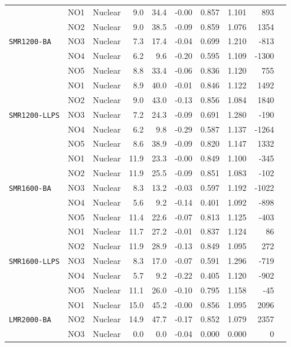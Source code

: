 \begin{table}[htbp]
\begin{tabular}{lllrrrrrrr}
\midrule
\multirow{5}{*}{\texttt{SMR1200-BA}} & NO1 & Nuclear & 9.0 & 34.4 & -0.00 & 0.857 & 1.101 & 893 \\
 & NO2 & Nuclear & 9.0 & 38.5 & -0.09 & 0.859 & 1.076 & 1354 \\
 & NO3 & Nuclear & 7.3 & 17.4 & -0.04 & 0.699 & 1.210 & -813 \\
 & NO4 & Nuclear & 6.2 & 9.6 & -0.20 & 0.595 & 1.109 & -1300 \\
 & NO5 & Nuclear & 8.8 & 33.4 & -0.06 & 0.836 & 1.120 & 755 \\
\midrule
\multirow{5}{*}{\texttt{SMR1200-LLPS}} & NO1 & Nuclear & 8.9 & 40.0 & -0.01 & 0.846 & 1.122 & 1492 \\
 & NO2 & Nuclear & 9.0 & 43.0 & -0.13 & 0.856 & 1.084 & 1840 \\
 & NO3 & Nuclear & 7.2 & 24.3 & -0.09 & 0.691 & 1.280 & -190 \\
 & NO4 & Nuclear & 6.2 & 9.8 & -0.29 & 0.587 & 1.137 & -1264 \\
 & NO5 & Nuclear & 8.6 & 38.9 & -0.09 & 0.820 & 1.147 & 1332 \\
\midrule
\multirow{5}{*}{\texttt{SMR1600-BA}} & NO1 & Nuclear & 11.9 & 23.3 & -0.00 & 0.849 & 1.100 & -345 \\
 & NO2 & Nuclear & 11.9 & 25.5 & -0.09 & 0.851 & 1.083 & -102 \\
 & NO3 & Nuclear & 8.3 & 13.2 & -0.03 & 0.597 & 1.192 & -1022 \\
 & NO4 & Nuclear & 5.6 & 9.2 & -0.14 & 0.401 & 1.092 & -898 \\
 & NO5 & Nuclear & 11.4 & 22.6 & -0.07 & 0.813 & 1.125 & -403 \\
\midrule
\multirow{5}{*}{\texttt{SMR1600-LLPS}} & NO1 & Nuclear & 11.7 & 27.2 & -0.01 & 0.837 & 1.124 & 86 \\
 & NO2 & Nuclear & 11.9 & 28.9 & -0.13 & 0.849 & 1.095 & 272 \\
 & NO3 & Nuclear & 8.3 & 17.0 & -0.07 & 0.591 & 1.296 & -719 \\
 & NO4 & Nuclear & 5.7 & 9.2 & -0.22 & 0.405 & 1.120 & -902 \\
 & NO5 & Nuclear & 11.1 & 26.0 & -0.10 & 0.795 & 1.158 & -45 \\
\midrule
\multirow{5}{*}{\texttt{LMR2000-BA}} & NO1 & Nuclear & 15.0 & 45.2 & -0.00 & 0.856 & 1.095 & 2096 \\
 & NO2 & Nuclear & 14.9 & 47.7 & -0.17 & 0.852 & 1.079 & 2357 \\
 & NO3 & Nuclear & 0.0 & 0.0 & -0.04 & 0.000 & 0.000 & 0 \\

\end{tabular}
\end{table}
